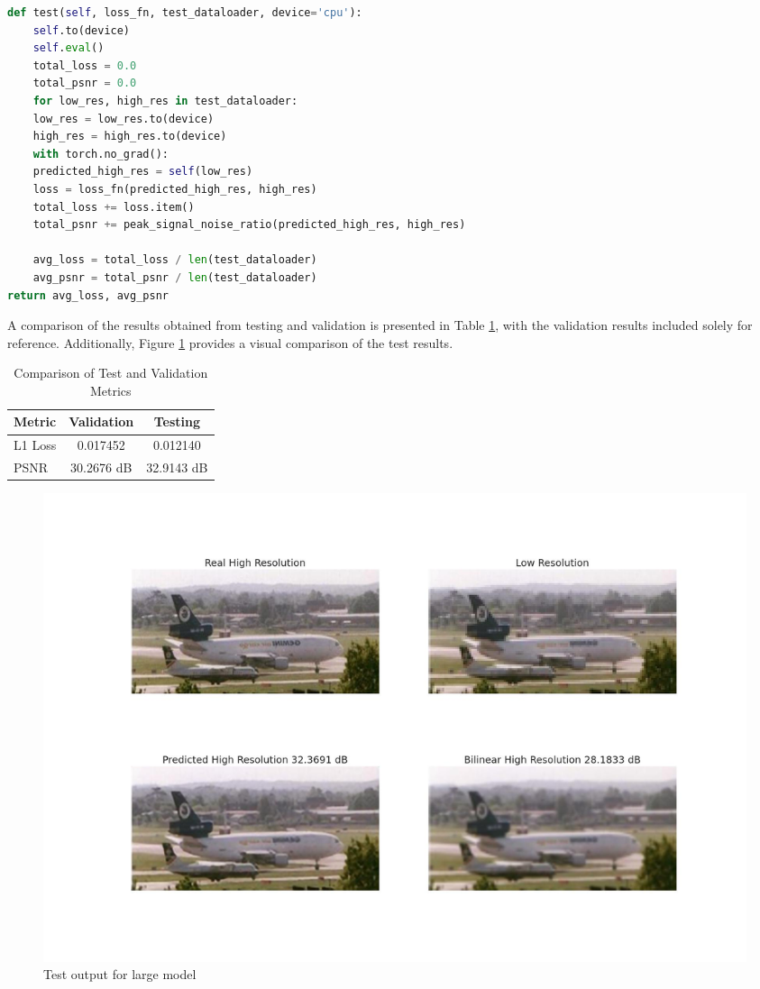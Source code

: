 \documentclass[../report.tex]{subfiles}
\begin{document}
\begin{lstlisting}[style=python, language=python, label={lst:test}, caption={Testing Method}]
def test(self, loss_fn, test_dataloader, device='cpu'):
	self.to(device)
	self.eval()
	total_loss = 0.0
	total_psnr = 0.0
	for low_res, high_res in test_dataloader:
	low_res = low_res.to(device)
	high_res = high_res.to(device)
	with torch.no_grad():
	predicted_high_res = self(low_res)
	loss = loss_fn(predicted_high_res, high_res)
	total_loss += loss.item()
	total_psnr += peak_signal_noise_ratio(predicted_high_res, high_res)
	
	avg_loss = total_loss / len(test_dataloader)
	avg_psnr = total_psnr / len(test_dataloader)
return avg_loss, avg_psnr
\end{lstlisting}
A comparison of the results obtained from testing and validation is presented in Table \ref{tab:test_results}, with the validation results included solely for reference. Additionally, Figure \ref{fig:test} provides a visual comparison of the test results.
\begin{table}[H]
	\centering
	\caption{Comparison of Test and Validation Metrics}
	\begin{tabular}{@{}lcc@{}}
		\toprule
		\textbf{Metric} & \textbf{Validation} & \textbf{Testing} \\ \midrule
		L1 Loss         & 0.017452            & 0.012140         \\ 
		PSNR            & 30.2676 dB         & 32.9143 dB       \\ 
		\bottomrule
	\end{tabular}
	\label{tab:test_results}
\end{table}
\begin{figure}[H]
	\caption{Test output for large model}
	\centering
	\label{fig:test}
	\includegraphics[width=\textwidth]{../images/test_prediction_comparison_large_model.jpg}
\end{figure}
\end{document}
